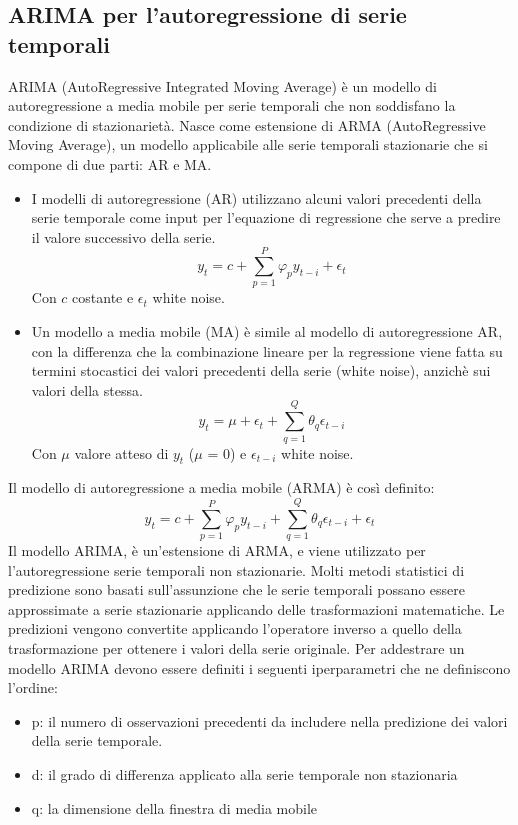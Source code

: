 \documentclass[10pt,journal,compsoc]{IEEEtran}
\begin{document}
\subsection{ARIMA per l'autoregressione di serie temporali}
\IEEEPARstart{} 
ARIMA (AutoRegressive Integrated Moving Average) è un modello di autoregressione a media mobile per serie temporali che non soddisfano la condizione di stazionarietà. Nasce come estensione di ARMA (AutoRegressive Moving Average),  un modello applicabile alle serie temporali stazionarie che si compone di due parti: AR e MA.
\begin{itemize}
\item
I modelli di autoregressione (AR) utilizzano alcuni valori precedenti della serie temporale come input per l’equazione di regressione che serve a predire il valore successivo della serie. 
\[y_t=c  + \sum_{p=1}^P \varphi_p y_{t-i} +\epsilon_t \tag{11}\]
Con \(c\) costante e \(\epsilon_t\) white noise.\\
\item 
Un modello a media mobile (MA)  è simile al modello di autoregressione AR, con la differenza che la combinazione lineare per la regressione viene fatta su termini stocastici dei valori precedenti della serie (white noise), anzichè sui valori della stessa. 
\[y_t=\mu  + \epsilon_t + \sum_{q=1}^Q \theta_q \epsilon_{t-i} \tag{12} \]
Con \(\mu\) valore atteso di \(y_t\) (\(\mu\) = 0) e \(\epsilon_{t-i}\) white noise.
\end{itemize}
Il modello di autoregressione a media mobile (ARMA) è così definito:
\[y_t=c  + \sum_{p=1}^P \varphi_p y_{t-i}  + \sum_{q=1}^Q \theta_q
\epsilon_{t-i}  +\epsilon_t \tag{13}\]
Il modello ARIMA, è un'estensione di ARMA, e viene utilizzato per l'autoregressione serie temporali non stazionarie. 
Molti metodi statistici di predizione sono basati sull’assunzione che le serie temporali possano essere approssimate a serie stazionarie applicando delle trasformazioni matematiche. Le predizioni vengono convertite applicando l’operatore inverso a quello della trasformazione per ottenere i valori della serie originale. Per addestrare un modello ARIMA devono essere definiti i seguenti iperparametri che ne definiscono l'ordine:
\begin{itemize}
\item p: il numero di osservazioni precedenti da includere nella predizione dei valori della serie temporale.
\item d: il grado di differenza applicato alla serie temporale non 
stazionaria
\item q: la dimensione della finestra di media mobile
\end{itemize}
\end{document}
